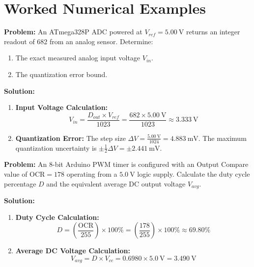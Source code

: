 \section{Worked Numerical Examples}

\begin{examplebox}
\textbf{Problem:} An ATmega328P ADC powered at $V_{ref} = \SI{5.00}{\volt}$ returns an integer readout of 682 from an analog sensor. Determine:
\begin{enumerate}
    \item The exact measured analog input voltage $V_{in}$.
    \item The quantization error bound.
\end{enumerate}

\textbf{Solution:}
\begin{enumerate}
    \item \textbf{Input Voltage Calculation:}
    \begin{equation}
    V_{in} = \frac{D_{out} \times V_{ref}}{1023} = \frac{682 \times \SI{5.00}{\volt}}{1023} \approx \SI{3.333}{\volt}
    \end{equation}
    \item \textbf{Quantization Error:}
    The step size $\Delta V = \frac{\SI{5.00}{\volt}}{1024} = \SI{4.883}{\milli\volt}$.
    The maximum quantization uncertainty is $\pm \frac{1}{2} \Delta V = \pm \SI{2.441}{\milli\volt}$.
\end{enumerate}
\end{examplebox}

\begin{examplebox}
\textbf{Problem:} An 8-bit Arduino PWM timer is configured with an Output Compare value of $\text{OCR} = 178$ operating from a $\SI{5.0}{\volt}$ logic supply. Calculate the duty cycle percentage $D$ and the equivalent average DC output voltage $V_{avg}$.

\textbf{Solution:}
\begin{enumerate}
    \item \textbf{Duty Cycle Calculation:}
    \begin{equation}
    D = \left( \frac{\text{OCR}}{255} \right) \times 100\% = \left( \frac{178}{255} \right) \times 100\% \approx 69.80\%
    \end{equation}
    \item \textbf{Average DC Voltage Calculation:}
    \begin{equation}
    V_{avg} = D \times V_{cc} = 0.6980 \times \SI{5.0}{\volt} = \SI{3.490}{\volt}
    \end{equation}
\end{enumerate}
\end{examplebox}

